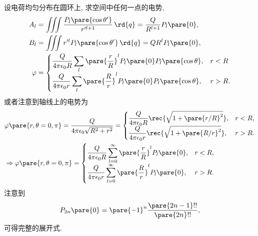 \documentclass[hidelinks]{ctexart}
\begin{document}
\begin{sample}
    \begin{ex}
        设电荷均匀分布在圆环上, 求空间中任何一点的电势,
        \begin{align*}
            A_l &= \iiint \frac{P_l\pare{\cos\theta'}}{r'^{l+1}}\,\rd{q} = \frac{Q}{R^{l+1}}P_l\pare{0}, \\
            B_l &= \iiint r'^l P_l\pare{\cos\theta'}\,\rd{q} = QR^l P_l\pare{0}, \\
            \varphi &= \begin{cases}
                \displaystyle \frac{Q}{4\pi\epsilon_0 R} \sum_l \pare{\frac{r}{R}}^l P_l\pare{0} P_l\pare{\cos\theta}, & r<R \\[.5em]
                \displaystyle \frac{Q}{4\pi\epsilon_0 r} \sum_l \pare{\frac{R}{r}}^{l}P_l\pare{0} P_l\pare{\cos\theta}, & r>R.
            \end{cases}
        \end{align*}
        或者注意到轴线上的电势为
        \begin{align*}
            & \varphi\pare{r,\theta = 0,\pi} = \frac{Q}{4\pi\epsilon_0 \sqrt{R^2+r^2}} = \begin{cases}
                \displaystyle \frac{Q}{4\pi\epsilon_0 R} \rec{\sqrt{1+\pare{r/R}^2}}, & r<R, \\
                \displaystyle \frac{Q}{4\pi\epsilon_0 r} \rec{\sqrt{1+\pare{R/r}^2}}, & r>R.
            \end{cases}\\
            & \Rightarrow \varphi\pare{r,\theta = 0,\pi} = \begin{cases}
                \displaystyle \frac{Q}{4\pi \epsilon_0 R} \sum_{l=0}^\infty \pare{\frac{r}{R}}^l P_l\pare{0}, & r<R, \\
                \displaystyle \frac{Q}{4\pi \epsilon_0 r} \sum_{l=0}^\infty \pare{\frac{R}{r}}^l P_l\pare{0}, & r>R.
            \end{cases}
        \end{align*}
        注意到
        \[ P_{2n}\pare{0} = \pare{-1}^n \frac{\pare{2n-1}!!}{\pare{2n}!!}, \]
        可得完整的展开式.
    \end{ex}
\end{sample}




\end{document}
